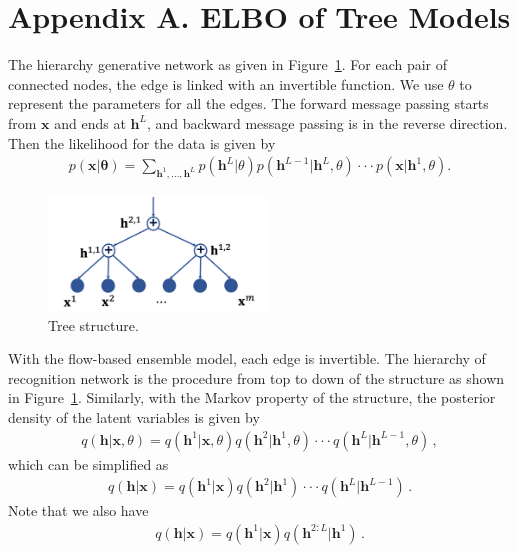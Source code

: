 \documentclass{article} %
\begin{document}

\clearpage



\clearpage
\section*{Appendix A.  ELBO of Tree Models}\label{appd:tree_elbo}

The hierarchy generative network as given in Figure~\ref{fig:tree-d}. For each pair of connected nodes, the edge is linked with an invertible function. We use $\theta$ to represent the parameters for all the edges.
The forward message passing starts from $\mathbf{x}$ and ends at $\mathbf{h}^L$, and backward message passing is in the reverse direction. 
 Then the
 likelihood for the data is given by
\begin{align*}
p(\mathbf{x}| \mathbf{\theta}) = \sum_{\mathbf{h}^1, ..., \mathbf{h}^L} p(\mathbf{h}^L | \theta)p(\mathbf{h}^{L-1} | \mathbf{h}^{L},\theta) \cdot \cdot  \cdot  p(\mathbf{x} | \mathbf{h}^{1}, \theta) .
\end{align*}

\begin{figure}[!htbp]
    \centering
    \includegraphics[width=2.3in]{fig/tree_direct.png}
    \caption{Tree structure.}
    \label{fig:tree-d}
\end{figure}

With the flow-based ensemble model, each edge is invertible.   The hierarchy of recognition network is the procedure from top to down of the structure as shown in Figure~\ref{fig:tree-d}.  Similarly, with the Markov property of the structure, the posterior density of the latent 
variables is given by
\begin{align*}
q(\mathbf{h}| \mathbf{x}, \theta ) = q(\mathbf{h}^1 | \mathbf{x}, \theta)  q(\mathbf{h}^2 | \mathbf{h}^1, \theta) \cdot \cdot  \cdot  q(\mathbf{h}^{L} | \mathbf{h}^{L-1}, \theta) \, ,
\end{align*}
which can be simplified as 
\begin{align*}
q(\mathbf{h}| \mathbf{x}) = q(\mathbf{h}^1 | \mathbf{x})  q(\mathbf{h}^2 | \mathbf{h}^1) \cdot \cdot  \cdot  q(\mathbf{h}^{L} | \mathbf{h}^{L-1}) \, .
\end{align*}
Note that we also have 
\begin{align} \label{eq:chain}
q(\mathbf{h}| \mathbf{x}) = q(\mathbf{h}^1 | \mathbf{x})  q(\mathbf{h}^{2:L} | \mathbf{h}^1) \, .
\end{align}
\end{document}
